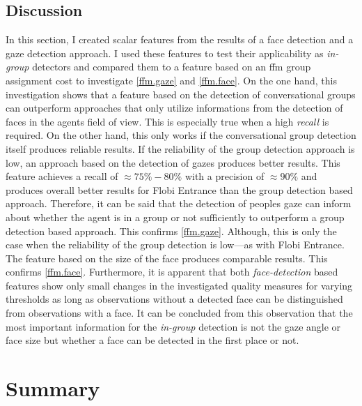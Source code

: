 \subsection{Discussion}

In this section, I created scalar features from the results of a face detection and a gaze detection approach.
I used these features to test their applicability as \emph{in-group} detectors and compared them to a feature based on an \gls{ffm} group assignment cost to investigate \cref{ffm.gaze} and \cref{ffm.face}.
On the one hand, this investigation shows that a feature based on the detection of \glspl{conversational group} can outperform approaches that only utilize informations from the detection of faces in the agents field of view.
This is especially true when a high \emph{recall} is required.
On the other hand, this only works if the \gls{conversational group} detection itself produces reliable results.
If the reliability of the group detection approach is low, an approach based on the detection of gazes produces better results.
This feature achieves a \gls{recall} of \(\approx 75\%-80\%\) with a \gls{precision} of \(\approx 90\%\) and produces overall better results for \gls{Flobi Entrance} than the group detection based approach.
Therefore, it can be said that the detection of peoples gaze can inform about whether the agent is in a group or not sufficiently to outperform a group detection based approach.
This confirms \cref{ffm.gaze}.
Although, this is only the case when the reliability of the group detection is low---as with \gls{Flobi Entrance}.
The feature based on the size of the face produces comparable results.
This confirms \cref{ffm.face}.
Furthermore, it is apparent that both \emph{face-detection} based features show only small changes in the investigated quality measures for varying thresholds as long as observations without a detected face can be distinguished from observations with a face.
It can be concluded from this observation that the most important information for the \emph{in-group} detection is not the gaze angle or face size but whether a face can be detected in the first place or not.


\section{Summary}

